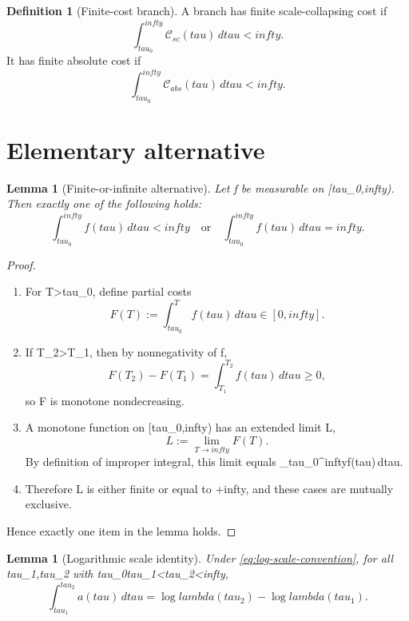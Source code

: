 \documentclass[11pt]{amsart}
\def\({}%
\def\){}%
\def\mathrm#1{#1}%
\def\tau{tau}%
\def\lambda{lambda}%
\def\infty{infty}%
\theoremstyle{plain}
\newtheorem{lemma}[theorem]{Lemma}
\theoremstyle{definition}
\newtheorem{definition}[theorem]{Definition}
\theoremstyle{remark}
\begin{document}
\begin{definition}[Finite-cost branch]\label{def:finite-cost-branch}
A branch has finite scale-collapsing cost if
\[
  \int_{\tau_0}^{\infty}\mathcal C_{\mathrm{sc}}(\tau)
  \,d\tau<\infty.
\]
It has finite absolute cost if
\[
  \int_{\tau_0}^{\infty}\mathcal C_{\mathrm{abs}}(\tau)
  \,d\tau<\infty.
\]
\end{definition}

\section{Elementary alternative}
\label{sec:cost}

\begin{lemma}[Finite-or-infinite alternative]\label{lem:finite-infinite}
Let \(f\) be measurable on \([\tau_0,\infty)\). Then exactly one of the following holds:
\[
  \int_{\tau_0}^{\infty}f(\tau)
  \,d\tau<\infty
  \quad\text{or}\quad
  \int_{\tau_0}^{\infty}f(\tau)
  \,d\tau=\infty.
\]
\end{lemma}

\begin{proof}
\begin{enumerate}[label=(\arabic*)]
  \item For \(T>\tau_0\), define partial costs
  \[
    F(T):=\int_{\tau_0}^{T}f(\tau)
    \,d\tau\in[0,\infty].
  \]

  \item If \(T_2>T_1\), then by nonnegativity of \(f\),
  \[
    F(T_2)-F(T_1)=\int_{T_1}^{T_2}f(\tau)
    \,d\tau\ge0,
  \]
  so \(F\) is monotone nondecreasing.

  \item A monotone function on \([\tau_0,\infty)\) has an extended limit
  \(L\in[0,\infty]\),
  \[
    L:=\lim_{T\to\infty}F(T).
  \]
  By definition of improper integral, this limit equals
  \(\int_{\tau_0}^{\infty}f(\tau)\,d\tau\).

  \item Therefore \(L\) is either finite or equal to \(+\infty\), and these
  cases are mutually exclusive.
\end{enumerate}
Hence exactly one item in the lemma holds.
\end{proof}

\begin{lemma}[Logarithmic scale identity]\label{lem:log-scale}
Under \eqref{eq:log-scale-convention}, for all \(\tau_1,\tau_2\) with
\(\tau_0\le\tau_1<\tau_2<\infty\),
\[
  \int_{\tau_1}^{\tau_2}a(\tau)
  \,d\tau
  =\log\lambda(\tau_2)-\log\lambda(\tau_1).
\]
\end{lemma}
\end{document}
